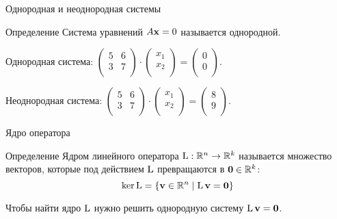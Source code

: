 \begin{frame}{Однородная и неоднородная системы}

\begin{block}{Определение}
    Система уравнений $A\mathbf{x} = 0$ называется \alert{однородной}.
\end{block}
\pause

Однородная система: 
$\begin{pmatrix}
    5 & 6 \\
    3 & 7 \\
\end{pmatrix} \cdot 
\begin{pmatrix}
    x_1 \\
    x_2 \\
\end{pmatrix} = \begin{pmatrix}
    0 \\
    0 \\
\end{pmatrix}$.
\pause

Неоднородная система: 
$\begin{pmatrix}
    5 & 6 \\
    3 & 7 \\
\end{pmatrix} \cdot 
\begin{pmatrix}
    x_1 \\
    x_2 \\
\end{pmatrix} = \begin{pmatrix}
    8 \\
    9 \\
\end{pmatrix}$.


\end{frame}



\begin{frame}{Ядро оператора}

\begin{block}{Определение}
\alert{Ядром} линейного оператора $\operatorname{L}: \mathbb{R}^n \to \mathbb{R}^k$ называется множество векторов,
которые под действием $\operatorname{L}$ превращаются в $\mathbf{0} \in \mathbb{R}^k$: 
\[
\ker \operatorname{L} = \{ \mathbf{v} \in \mathbb{R}^n \mid \operatorname{L} \mathbf{v} = \mathbf{0} \}    
\]
\end{block}

\pause
Чтобы найти ядро $\operatorname{L}$ нужно решить однородную систему $\operatorname{L} \mathbf{v} = \mathbf{0}$.

\end{frame}



